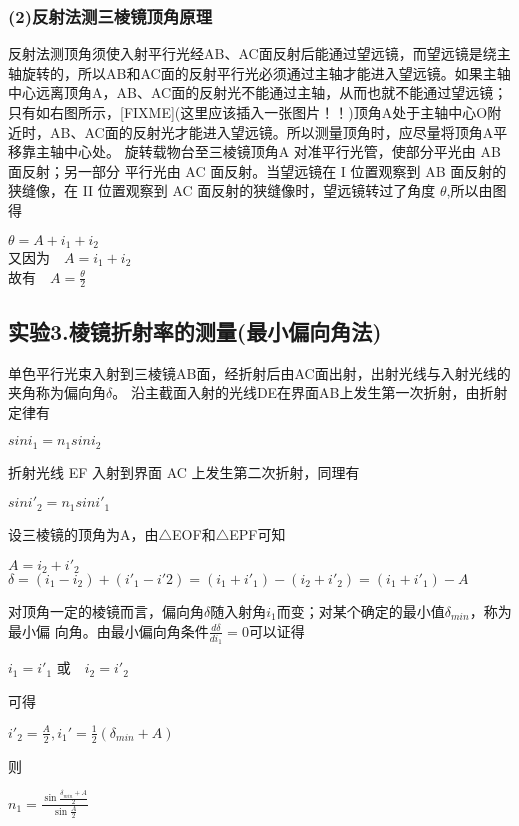\subsubsection*{(2)反射法测三棱镜顶角原理}
     反射法测顶角须使入射平行光经AB、AC面反射后能通过望远镜，而望远镜是绕主轴旋转的，所以AB和AC面的反射平行光必须通过主轴才能进入望远镜。如果主轴中心远离顶角A，AB、AC面的反射光不能通过主轴，从而也就不能通过望远镜；只有如右图所示，[FIXME](这里应该插入一张图片！！)顶角A处于主轴中心O附近时，AB、AC面的反射光才能进入望远镜。所以测量顶角时，应尽量将顶角A平移靠主轴中心处。
     旋转载物台至三棱镜顶角A 对准平行光管，使部分平光由 AB 面反射；另一部分
平行光由 AC 面反射。当望远镜在 I 位置观察到 AB 面反射的狭缝像，在 II 位置观察到 AC 面反射的狭缝像时，望远镜转过了角度 $\theta$,所以由图得
\begin{center}
$\theta =A+i_{1}+i_{2}$\\
又因为　$A=i_{1}+i_{2}$\\
故有　$A=\displaystyle\frac{\theta}{2}$
\end{center}
     

\subsection*{实验3.棱镜折射率的测量(最小偏向角法)}
单色平行光束入射到三棱镜AB面，经折射后由AC面出射，出射光线与入射光线的夹角称为偏向角$\delta$。
沿主截面入射的光线DE在界面AB上发生第一次折射，由折射定律有
\begin{center}
$sin{i_1}={n_1}sin{i_2}$
\end{center}
折射光线 EF 入射到界面 AC 上发生第二次折射，同理有
\begin{center}
$sin{i'_2}={n_1}sin{i'_1}$
\end{center}

设三棱镜的顶角为A，由$\bigtriangleup$EOF和$\bigtriangleup$EPF可知

\begin{center}
 $A={i_2}+{i'_2}$\\
 $\delta=({i_1}-{i_2})+({i'_1-i'2})=({i_1}+{i'_1})-({i_2}+{i'_2})=({i_1}+{i'_1})-A$
\end{center}
对顶角一定的棱镜而言，偏向角$\delta$随入射角$i_1$而变；对某个确定的最小值${\delta}_{min}$，称为最小偏
向角。由最小偏向角条件$\frac{d\delta}{d{i_1}}=0$可以证得
\begin{center}
${i_1}={i'_1}$ 或　${i_2}={i'_2}$
\end{center}
可得
\begin{center}
${i'_2}=\displaystyle\frac{A}{2},{i_{1}}'=\frac{1}{2}(\delta _{min}+A)$
\end{center}
则
\begin{center}
$n_{1}=\displaystyle\frac{\sin\displaystyle\frac{\delta _{min}+A}{2}}{\sin \displaystyle\frac{A}{2}}$
\end{center}

